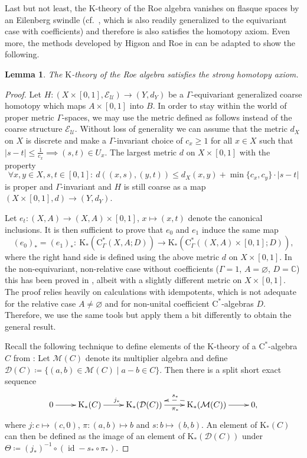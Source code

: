 \documentclass[pdftex]{sigma}
\numberwithin{equation}{section}
\newtheorem{lem}[thm]{Lemma}
\theoremstyle{definition}
\newcommand{\C}{\mathbb{C}}
\newcommand{\cU}{\mathcal{U}}
\newcommand{\coarseStr}{\mathcal{E}}
\DeclareMathOperator{\id}{id}
\newcommand{\K}{\mathrm{K}}
\newcommand{\textCstar}{\ensuremath{\mathrm{C}^*\!}}
\newcommand{\Roe}{\mathrm{C}^*}
\newcommand{\multiplier}{{\mathcal{M}}}
\newcommand{\doubleplier}{{\mathcal{D}}}
\begin{document}
Last but not least, the $\K$-theory of the Roe algebra vanishes on flasque spaces by an Eilenberg swindle (cf.\ \cite[Proposition 9.4]{RoeITCGTM}, which is also readily generalized to the equivariant case with coefficients) and therefore is also satisfies the homotopy axiom.
Even more, the methods developed by Higson and Roe in \cite{HigsonRoeHomotopy} can be adapted to show the following.
\begin{lem}\label{lem:Roestronghomotopy}
The $\K$-theory of the Roe algebra satisfies the strong homotopy axiom.
\end{lem}
\begin{proof}
Let $H\colon (X\times [0,1],\coarseStr_\cU)\to (Y,d_Y)$ be a $\Gamma$-equivariant generalized coarse homotopy which maps $A\times[0,1]$ into $B$.
In order to stay within the world of proper metric $\Gamma$-spaces, we may use the metric defined as follows instead of the coarse structure $\coarseStr_\cU$.
Without loss of generality we can assume that the metric $d_X$ on $X$ is discrete and make a $\Gamma$-invariant choice of $c_x\geq 1$ for all $x\in X$ such that $|s-t|\leq \frac{1}{c_x}\implies (s,t)\in U_x$.
The largest metric $d$ on $X\times [0,1]$ with the property
\[
\forall x,y\in X,s,t\in[0,1]\colon\ d((x,s),(y,t))\leq d_X(x,y)+\min\{c_x,c_y\}\cdot |s-t|
\]
is proper and $\Gamma$-invariant and $H$ is still coarse as a map $(X\times [0,1],d)\to (Y,d_Y)$.

Let $e_t\colon (X,A)\to (X,A)\times[0,1]$, $x\mapsto (x,t)$ denote the canonical inclusions. It is then sufficient to prove that $e_0$ and $e_1$ induce the same map
\[
(e_0)_*=(e_1)_*\colon\ \K_*(\Roe_\Gamma(X,A;D))\to\K_*(\Roe_\Gamma((X,A)\times[0,1];D)),
\]
where the right hand side is defined using the above metric $d$ on $X\times[0,1]$.
In the non-equivariant, non-relative case without coefficients ($\Gamma=1$, $A=\varnothing$, $D=\C$) this has been proved in \cite[Sections~5 and~6]{HigsonRoeHomotopy}, albeit with a slightly different metric on $X\times [0,1]$.
The proof relies heavily on calculations with idempotents, which is not adequate for the relative case $A\not=\varnothing$ and for non-unital coefficient \textCstar-algebras $D$. Therefore, we use the same tools but apply them a bit differently to obtain the general result.

Recall the following technique to define elements of the $\K$-theory of a \textCstar-algebra $C$ from \cite[Section 4]{HigsonRoeHomotopy}:
Let $\multiplier(C)$ denote its multiplier algebra and define $\doubleplier(C)\coloneqq \{(a,b)\in\multiplier(C)\mid a-b\allowbreak\in C\}$.
Then there is a split short exact sequence
\[
\xymatrix{0\ar[r]&\K_*(C)\ar[r]^{j_*}&\K_*(\doubleplier(C))\ar[r]_{\pi_*} &\K_*(\multiplier(C))\ar[r]\ar@/_/@{-->}[l]_{s_*}&0,}
\]
where $j\colon c\mapsto (c,0)$, $\pi\colon (a,b)\mapsto b$ and $s\colon b\mapsto (b,b)$.
An element of $\K_*(C)$ can then be defined as the image of an element of $\K_*(\doubleplier(C))$ under $\Theta\coloneqq(j_*)^{-1}\circ(\id-s_*\circ\pi_*)$.


\end{proof}
\end{document}
